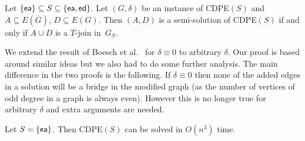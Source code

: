 \documentclass[11pt]{llncs}
\newcommand{\ed}{{\sf ed}}
\newcommand{\ea}{{\sf ea}}
\newcommand{\cdpe}{{\sc CDPE}}
\begin{document}
\begin{sloppypar}
\begin{lemma}\label{lem:struct-undir}
Let $\{\ea\}  \subseteq S \subseteq \{\ea,\ed\}$. Let $(G,\delta)$ be an instance of
\cdpe$(S)$ and~$A \subseteq E(\overline{G})$, $D \subseteq E(G)$.  Then
$(A,D)$ is a semi-solution of \cdpe$(S)$ if and only if $A \cup D$ is a
$T$-join in~$G_S$.
\end{lemma}
\end{sloppypar}

We extend the result of Boesch et al.~\cite{BoeschST77} for $\delta\equiv 0$ to arbitrary $\delta$. Our proof
is based around similar ideas but we also had to do some further analysis. The
main difference in the two proofs is the following. If $\delta \equiv 0$ then
none of the added edges in a solution will be a bridge in the modified graph
(as the number of vertices of odd degree in a graph is always even). However
this is no longer true for arbitrary $\delta$ and extra arguments are needed.

\begin{theorem}\label{thm:add-undi}
Let $S=\{\ea\}$. Then \cdpe$(S)$ can be solved in $O(n^3)$ time.
\end{theorem} 
\end{document}
